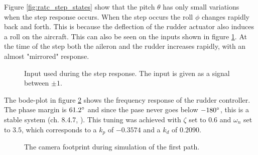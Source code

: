Figure \ref{fig:ratc_step_states} show that the pitch $\theta$ has only small variations when the step response occurs. When the step occurs the roll $\phi$ changes rapidly back and forth. This is because the deflection of the rudder actuator also induces a roll on the aircraft. This can also be seen on the inputs shown in figure \ref{fig:ratc_step_input}. At the time of the step both the aileron and the rudder increases rapidly, with an almost "mirrored" response.

\begin{figure}[]
    \centering
    \caption{Input used during the step response. The input is given as a signal between $\pm1$.}
	\label{fig:ratc_step_input}
\end{figure}

The bode-plot in figure \ref{fig:ratc_bode} shows the frequency response of the rudder controller. The phase margin is $61.2\degree$ and since the pase never goes below $-180\degree$, this is a stable system (ch. 8.4.7, \cite{regBALCHEN}). This tuning was achieved with $\zeta$ set to $0.6$ and $\omega_n$ set to $3.5$, which corresponds to a $k_p$ of $-0.3574$ and a $k_d$ of $0.2090$.

\begin{figure}[]
    \centering
    \caption{The camera footprint during simulation of the first path.}
	\label{fig:ratc_bode}
\end{figure}


